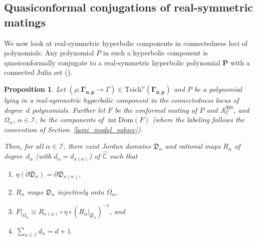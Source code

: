 \documentclass[JEP,XML,SOM,Unicode,NoFloatCountersInSection,published]{cedram}
\newtheorem{proposition}[lemma]{Proposition}
\theoremstyle{definition}
\theoremstyle{remark}
\newcommand{\C}{\mathbb{C}}
\DeclareMathOperator{\Int}{int}
\begin{document}
\subsection{Quasiconformal conjugations of real-symmetric matings}\label{qc_real_sym_mating_subsec}

We now look at real-symmetric hyperbolic components in connectedness loci of polynomials. Any polynomial $P$ in such a hyperbolic component is quasiconformally conjugate to a real-symmetric hyperbolic polynomial $\pmb{P}$ with a connected Julia set (\cf \cite{MS98}).

\begin{proposition}\label{mating_class_prop}
Let $(\rho:\pmb{\Gamma_{n,p}}\to\Gamma)\in\mathrm{Teich}^\omega(\pmb{\Gamma_{n,p}})$ and $P$ be a polynomial lying in a real-symmetric hyperbolic component in the connectedness locus of degree~$d$ polynomials. Further let $F$ be the conformal mating of $P$ and $A_{\Gamma}^{\mathrm{fBS}}$, and $\Omega_\alpha$, \hbox{$\alpha\!\in\!\mathcal{I}$}, be the components of $\Int{\mathrm{Dom}(F)}$ (where the labeling follows the convention of Section~\ref{lami_model_subsec}).

Then, for all $\alpha\in\mathcal{I}$, there exist Jordan domains $\mathfrak{D}_\alpha$ and rational maps $R_\alpha$ of degree~$d_\alpha$ (with $d_\alpha=d_{\kappa(\alpha)}$) of $\widehat{\C}$ such that
\begin{enumerate}
\item $\eta(\partial\mathfrak{D}_\alpha)=\partial\mathfrak{D}_{\kappa(\alpha)}$,

\item $R_\alpha$ maps $\overline{\mathfrak{D}_\alpha}$ injectively onto $\overline{\Omega_\alpha}$,

\item $F\vert_{\overline{\Omega_\alpha}}\equiv R_{\kappa(\alpha)}\circ\eta\circ(R_\alpha\vert_{\overline{\mathfrak{D}_\alpha}})^{-1}$, and

\item $\sum_{\alpha\in\mathcal{I}} d_\alpha = d+1$.
\end{enumerate}
\end{proposition}
\end{document}
